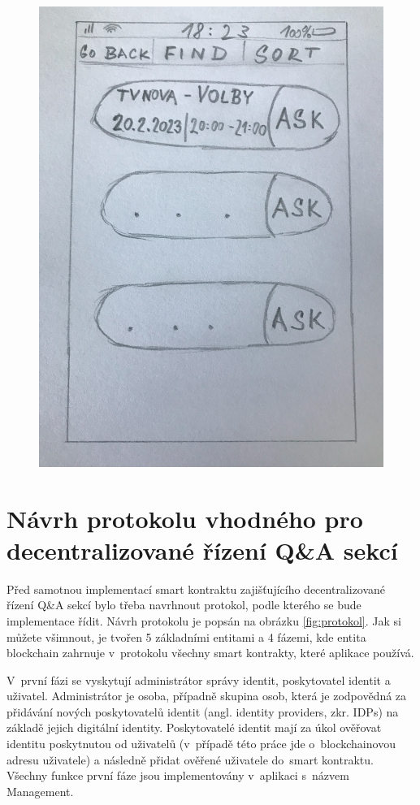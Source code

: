 \begin{figure}
\begin{minipage}{.5\textwidth}
  \includegraphics[width=.9\linewidth]{obrazky/Navrh_prehled.png}
  \label{fig:navrh2}
\end{minipage}
\end{figure}

\section{Návrh protokolu vhodného pro decentralizované řízení Q\&A sekcí}
\label{protokol}
Před samotnou implementací smart kontraktu zajišťujícího decentralizované řízení Q\&A sekcí bylo třeba navrhnout protokol, podle kterého se bude implementace řídit. Návrh protokolu je popsán na obrázku \ref{fig:protokol}. Jak si můžete všimnout, je tvořen 5 základními entitami a 4 fázemi, kde entita blockchain zahrnuje v~protokolu všechny smart kontrakty, které aplikace používá. 

V~první fázi se vyskytují administrátor správy identit, poskytovatel identit a uživatel. Administrátor je osoba, případně skupina osob, která je zodpovědná za přidávání nových poskytovatelů identit (angl. identity providers, zkr. IDPs) na základě jejich digitální identity. Poskytovatelé identit mají za úkol ověřovat identitu poskytnutou od uživatelů (v~případě této práce jde o~blockchainovou adresu uživatele) a následně přidat ověřené uživatele do~smart kontraktu. Všechny funkce první fáze jsou implementovány v~aplikaci s~názvem Management.  

